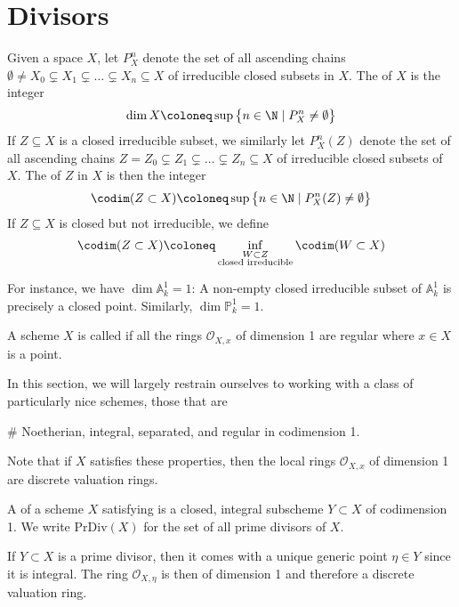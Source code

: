 \documentclass[wip, algebra]{bsteffan-lecturenotes}
\newcommand{\cO}{\mathcal{O}}
\newcommand{\A}{\mathbb{A}}
\renewcommand{\P}{\mathbb{P}}
\newcommand{\PrDiv}{\mathrm{PrDiv}}
\begin{document}
\section{Divisors}
\begin{definition}
	Given a space $X$, let $P_X^n$ denote the set of all ascending chains $\emptyset \neq X_0 \subsetneq X_1 \subsetneq \ldots \subsetneq X_n \subseteq X$ of irreducible closed subsets in $X$.  
	The  of $X$ is the integer
	\begin{equation*}
		\dim X \coloneq \sup \big\{n \in \N \mid P^n_X \neq \emptyset\big\}
	\end{equation*}
	If $Z \subseteq X$ is a closed irreducible subset, we similarly let $P_X^n(Z)$ denote the set of all ascending chains $Z = Z_0 \subsetneq Z_1 \subsetneq \ldots \subsetneq Z_n \subseteq X$ of irreducible closed subsets of $X$.
	The  of $Z$ in $X$ is then the integer
	\begin{equation*}
		\codim(Z \subset X) \coloneq \sup \big\{n \in \N \mid P^n_X(Z) \neq \emptyset\big\}
	\end{equation*}
	If $Z \subseteq X$ is closed but not irreducible, we define
	\begin{equation*}
		\codim(Z \subset X) \coloneq \inf_{\substack{W \subset Z \\ \text{closed irreducible}}} \codim(W \subset X)
	\end{equation*}
\end{definition}
For instance, we have $\dim \A^1_k = 1$: A non-empty closed irreducible subset of $\A^1_k$ is precisely a closed point.
Similarly, $\dim \P^1_k = 1$.
\begin{definition}
	A scheme $X$ is called  if all the rings $\cO_{X, x}$ of dimension 1 are regular where $x \in X$ is a point.
\end{definition}
In this section, we will largely restrain ourselves to working with a class of particularly nice schemes, those that are\textellipsis{}
\begin{alphanumerate}
	\item[\#]\label{ass:divs:standard} Noetherian, integral, separated, and regular in codimension 1.
\end{alphanumerate}
Note that if $X$ satisfies these properties, then the local rings $\cO_{X, x}$ of dimension 1 are discrete valuation rings.
\begin{definition}
	A  of a scheme $X$ satisfying  is a closed, integral subscheme $Y \subset X$ of codimension 1.
	We write $\PrDiv(X)$ for the set of all prime divisors of $X$.
\end{definition}
If $Y \subset X$ is a prime divisor, then it comes with a unique generic point $\eta \in Y$ since it is integral.
The ring $\cO_{X, \eta}$ is then of dimension 1 and therefore a discrete valuation ring.
\end{document}
